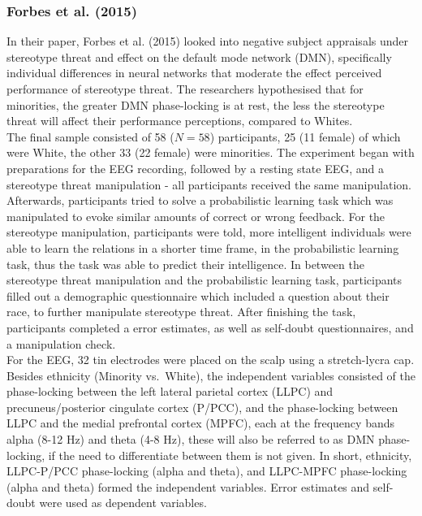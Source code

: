 \documentclass[
  stu,floatsintext]{apa7}
\begin{document}
\subsubsection{Forbes et al. (2015)}\label{forbesspontaneousdefaultmode2015}

In their paper, Forbes et al. (2015) looked into negative subject appraisals under stereotype threat and effect on the default mode network (DMN), specifically individual differences in neural networks that moderate the effect perceived performance of stereotype threat.
The researchers hypothesised that for minorities, the greater DMN phase-locking is at rest, the less the stereotype threat will affect their performance perceptions, compared to Whites.\\
The final sample consisted of 58 (\(N = 58\)) participants, 25 (11 female) of which were White, the other 33 (22 female) were minorities.
The experiment began with preparations for the EEG recording, followed by a resting state EEG, and a stereotype threat manipulation - all participants received the same manipulation.
Afterwards, participants tried to solve a probabilistic learning task which was manipulated to evoke similar amounts of correct or wrong feedback.
For the stereotype manipulation, participants were told, more intelligent individuals were able to learn the relations in a shorter time frame, in the probabilistic learning task, thus the task was able to predict their intelligence.
In between the stereotype threat manipulation and the probabilistic learning task, participants filled out a demographic questionnaire which included a question about their race, to further manipulate stereotype threat.
After finishing the task, participants completed a error estimates, as well as self-doubt questionnaires, and a manipulation check.\\
For the EEG, 32 tin electrodes were placed on the scalp using a stretch-lycra cap.
Besides ethnicity (Minority vs.~White), the independent variables consisted of the phase-locking between the left lateral parietal cortex (LLPC) and precuneus/posterior cingulate cortex (P/PCC), and the phase-locking between LLPC and the medial prefrontal cortex (MPFC), each at the frequency bands alpha (8-12 Hz) and theta (4-8 Hz), these will also be referred to as DMN phase-locking, if the need to differentiate between them is not given.
In short, ethnicity, LLPC-P/PCC phase-locking (alpha and theta), and LLPC-MPFC phase-locking (alpha and theta) formed the independent variables.
Error estimates and self-doubt were used as dependent variables.\\
\end{document}
